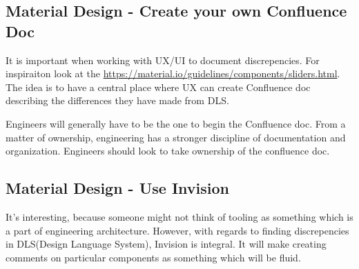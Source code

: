 \subsection{ Material Design - Create your own Confluence Doc }

It is important when working with UX/UI to document discrepencies. For
inspiraiton look at the \href{material design docs}{https://material.io/guidelines/components/sliders.html}.
The idea is to have a central place where UX can create Confluence doc
describing the differences they have made from DLS.

Engineers will generally have to be the one to begin the Confluence doc. From a
matter of ownership, engineering has a stronger discipline of documentation and
organization. Engineers should look to take ownership of the confluence doc.

\subsection{ Material Design - Use Invision }
It's interesting, because someone might not think of tooling as something which
is a part of engineering architecture. However, with regards to finding
discrepencies in DLS(Design Language System), Invision is integral. It will
make creating comments on particular components as something which will be fluid. 
